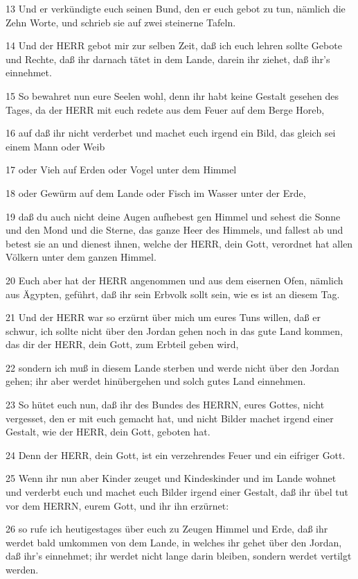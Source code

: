 \par 13 Und er verkündigte euch seinen Bund, den er euch gebot zu tun, nämlich die Zehn Worte, und schrieb sie auf zwei steinerne Tafeln.
\par 14 Und der HERR gebot mir zur selben Zeit, daß ich euch lehren sollte Gebote und Rechte, daß ihr darnach tätet in dem Lande, darein ihr ziehet, daß ihr's einnehmet.
\par 15 So bewahret nun eure Seelen wohl, denn ihr habt keine Gestalt gesehen des Tages, da der HERR mit euch redete aus dem Feuer auf dem Berge Horeb,
\par 16 auf daß ihr nicht verderbet und machet euch irgend ein Bild, das gleich sei einem Mann oder Weib
\par 17 oder Vieh auf Erden oder Vogel unter dem Himmel
\par 18 oder Gewürm auf dem Lande oder Fisch im Wasser unter der Erde,
\par 19 daß du auch nicht deine Augen aufhebest gen Himmel und sehest die Sonne und den Mond und die Sterne, das ganze Heer des Himmels, und fallest ab und betest sie an und dienest ihnen, welche der HERR, dein Gott, verordnet hat allen Völkern unter dem ganzen Himmel.
\par 20 Euch aber hat der HERR angenommen und aus dem eisernen Ofen, nämlich aus Ägypten, geführt, daß ihr sein Erbvolk sollt sein, wie es ist an diesem Tag.
\par 21 Und der HERR war so erzürnt über mich um eures Tuns willen, daß er schwur, ich sollte nicht über den Jordan gehen noch in das gute Land kommen, das dir der HERR, dein Gott, zum Erbteil geben wird,
\par 22 sondern ich muß in diesem Lande sterben und werde nicht über den Jordan gehen; ihr aber werdet hinübergehen und solch gutes Land einnehmen.
\par 23 So hütet euch nun, daß ihr des Bundes des HERRN, eures Gottes, nicht vergesset, den er mit euch gemacht hat, und nicht Bilder machet irgend einer Gestalt, wie der HERR, dein Gott, geboten hat.
\par 24 Denn der HERR, dein Gott, ist ein verzehrendes Feuer und ein eifriger Gott.
\par 25 Wenn ihr nun aber Kinder zeuget und Kindeskinder und im Lande wohnet und verderbt euch und machet euch Bilder irgend einer Gestalt, daß ihr übel tut vor dem HERRN, eurem Gott, und ihr ihn erzürnet:
\par 26 so rufe ich heutigestages über euch zu Zeugen Himmel und Erde, daß ihr werdet bald umkommen von dem Lande, in welches ihr gehet über den Jordan, daß ihr's einnehmet; ihr werdet nicht lange darin bleiben, sondern werdet vertilgt werden.
